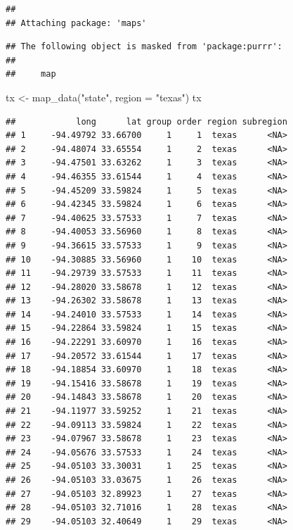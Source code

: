 \documentclass[
]{article}
\newenvironment{Shaded}{\begin{snugshade}}{\end{snugshade}}
\newcommand{\AttributeTok}[1]{\textcolor[rgb]{0.77,0.63,0.00}{#1}}
\newcommand{\FunctionTok}[1]{\textcolor[rgb]{0.00,0.00,0.00}{#1}}
\newcommand{\NormalTok}[1]{#1}
\newcommand{\OtherTok}[1]{\textcolor[rgb]{0.56,0.35,0.01}{#1}}
\newcommand{\StringTok}[1]{\textcolor[rgb]{0.31,0.60,0.02}{#1}}
\begin{document}
\begin{verbatim}
## 
## Attaching package: 'maps'
\end{verbatim}

\begin{verbatim}
## The following object is masked from 'package:purrr':
## 
##     map
\end{verbatim}

\begin{Shaded}
\begin{Highlighting}[]
\NormalTok{tx }\OtherTok{\textless{}{-}} \FunctionTok{map\_data}\NormalTok{(}\StringTok{"state"}\NormalTok{, }\AttributeTok{region =} \StringTok{"texas"}\NormalTok{)}
\NormalTok{tx}
\end{Highlighting}
\end{Shaded}

\begin{verbatim}
##            long      lat group order region subregion
## 1     -94.49792 33.66700     1     1  texas      <NA>
## 2     -94.48074 33.65554     1     2  texas      <NA>
## 3     -94.47501 33.63262     1     3  texas      <NA>
## 4     -94.46355 33.61544     1     4  texas      <NA>
## 5     -94.45209 33.59824     1     5  texas      <NA>
## 6     -94.42345 33.59824     1     6  texas      <NA>
## 7     -94.40625 33.57533     1     7  texas      <NA>
## 8     -94.40053 33.56960     1     8  texas      <NA>
## 9     -94.36615 33.57533     1     9  texas      <NA>
## 10    -94.30885 33.56960     1    10  texas      <NA>
## 11    -94.29739 33.57533     1    11  texas      <NA>
## 12    -94.28020 33.58678     1    12  texas      <NA>
## 13    -94.26302 33.58678     1    13  texas      <NA>
## 14    -94.24010 33.57533     1    14  texas      <NA>
## 15    -94.22864 33.59824     1    15  texas      <NA>
## 16    -94.22291 33.60970     1    16  texas      <NA>
## 17    -94.20572 33.61544     1    17  texas      <NA>
## 18    -94.18854 33.60970     1    18  texas      <NA>
## 19    -94.15416 33.58678     1    19  texas      <NA>
## 20    -94.14843 33.58678     1    20  texas      <NA>
## 21    -94.11977 33.59252     1    21  texas      <NA>
## 22    -94.09113 33.59824     1    22  texas      <NA>
## 23    -94.07967 33.58678     1    23  texas      <NA>
## 24    -94.05676 33.57533     1    24  texas      <NA>
## 25    -94.05103 33.30031     1    25  texas      <NA>
## 26    -94.05103 33.03675     1    26  texas      <NA>
## 27    -94.05103 32.89923     1    27  texas      <NA>
## 28    -94.05103 32.71016     1    28  texas      <NA>
## 29    -94.05103 32.40649     1    29  texas      <NA>

\end{verbatim}
\end{document}
